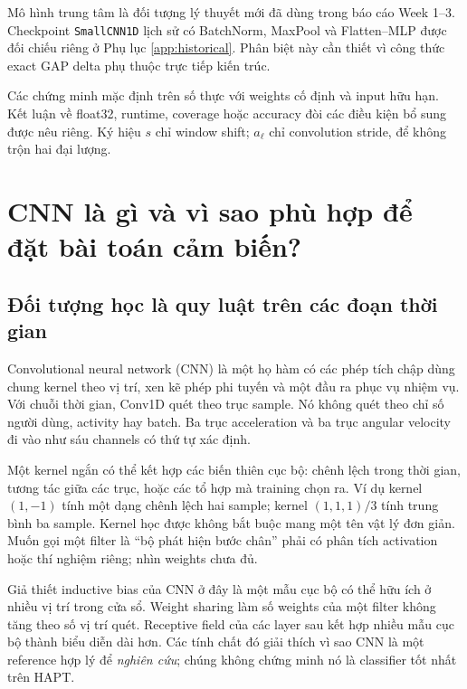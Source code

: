 \documentclass[11pt,a4paper]{article}
\newcommand{\code}[1]{{\small\ttfamily\nolinkurl{#1}}}
\theoremstyle{definition}
\begin{document}
Mô hình trung tâm là đối tượng lý thuyết mới đã dùng trong báo cáo Week
1--3. Checkpoint \code{SmallCNN1D} lịch sử có BatchNorm, MaxPool và
Flatten--MLP được đối chiếu riêng ở Phụ lục \ref{app:historical}. Phân biệt
này cần thiết vì công thức exact GAP delta phụ thuộc trực tiếp kiến trúc.

Các chứng minh mặc định trên số thực với weights cố định và input hữu hạn.
Kết luận về float32, runtime, coverage hoặc accuracy đòi các điều kiện bổ
sung được nêu riêng. Ký hiệu $s$ chỉ window shift; $a_\ell$ chỉ convolution
stride, để không trộn hai đại lượng.

\begingroup\small\setlength{\parskip}{0pt}
\tableofcontents
\endgroup
\clearpage

\section{CNN là gì và vì sao phù hợp để đặt bài toán cảm biến?}
\subsection{Đối tượng học là quy luật trên các đoạn thời gian}
Convolutional neural network (CNN) là một họ hàm có các phép tích chập
dùng chung kernel theo vị trí, xen kẽ phép phi tuyến và một đầu ra phục
vụ nhiệm vụ. Với chuỗi thời gian, Conv1D quét theo trục sample. Nó không
quét theo chỉ số người dùng, activity hay batch. Ba trục acceleration và
ba trục angular velocity đi vào như sáu channels có thứ tự xác định.

Một kernel ngắn có thể kết hợp các biến thiên cục bộ: chênh lệch trong
thời gian, tương tác giữa các trục, hoặc các tổ hợp mà training chọn ra.
Ví dụ kernel $(1,-1)$ tính một dạng chênh lệch hai sample; kernel
$(1,1,1)/3$ tính trung bình ba sample. Kernel học được không bắt buộc mang
một tên vật lý đơn giản. Muốn gọi một filter là ``bộ phát hiện bước chân''
phải có phân tích activation hoặc thí nghiệm riêng; nhìn weights chưa đủ.

Giả thiết inductive bias của CNN ở đây là một mẫu cục bộ có thể hữu ích ở
nhiều vị trí trong cửa sổ. Weight sharing làm số weights của một filter
không tăng theo số vị trí quét. Receptive field của các layer sau kết hợp
nhiều mẫu cục bộ thành biểu diễn dài hơn. Các tính chất đó giải thích vì
sao CNN là một reference hợp lý để \emph{nghiên cứu}; chúng không chứng
minh nó là classifier tốt nhất trên HAPT.
\end{document}
